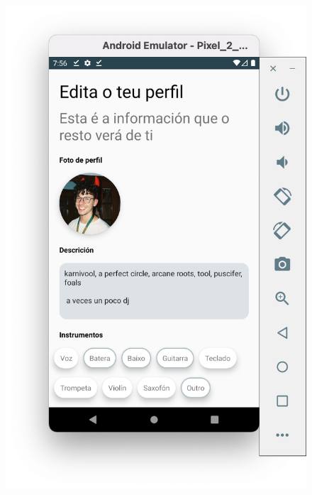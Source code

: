 \documentclass[a4paper,12pt]{article}
\begin{document}
\begin{figure}[H]
	\centering
	\includegraphics[scale=.42]{6.png}
\end{figure}
\end{document}
